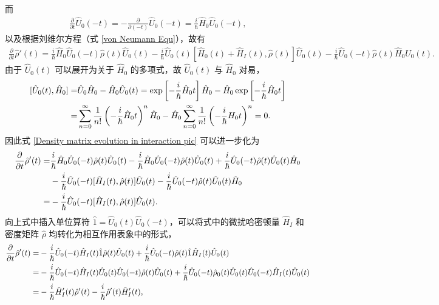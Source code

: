 \documentclass{thesis}
\begin{document}
而
\begin{align}
    \frac{\partial}{\partial t}\hat{U}_0(-t)=-\frac{\partial}{\partial(-t)}\hat{U}_0(-t)=\frac{i}{\hbar}\hat{H}_0\hat{U}_0(-t),
\end{align}
以及根据刘维尔方程（式 \eqref{von Neumann Equ}），故有
\begin{align}
    \label{Density matrix evolution in interaction pic}
    \frac{\partial}{\partial t}\hat{\rho}'(t)=\frac{i}{\hbar}\hat{H}_0\hat{U}_0(-t)\hat{\rho}(t)\hat{U}_0(t)-\frac{i}{\hbar}\hat{U}_0(t)[\hat{H}_0(t)+\hat{H}_I(t),\hat{\rho}(t)]\hat{U}_0(t)-\frac{i}{\hbar}\hat{U}_0(-t)\hat{\rho}(t)\hat{H}_0\hat{U}_0(t).
\end{align}
由于 $\hat{U}_0(t)$ 可以展开为关于 $\hat{H}_0$ 的多项式，故 $\hat{U}_0(t)$ 与 $\hat{H}_0$ 对易，
\begin{align}
    \notag[\hat{U}_0(t),\hat{H}_0]=&\hat{U}_0\hat{H}_0-\hat{H}_0\hat{U}_0(t)=\exp\left[-\frac{i}{\hbar}\hat{H}_0t\right]\hat{H}_0-\hat{H}_0\exp\left[-\frac{i}{\hbar}\hat{H}_0t\right]\\
    =&\sum_{n=0}^{\infty}\frac{1}{n!}\left(-\frac{i}{\hbar}\hat{H}_0t\right)^n\hat{H}_0-\hat{H}_0\sum_{n=0}^{\infty}\frac{1}{n!}\left(-\frac{i}{\hbar}H_0t\right)^n=0.
\end{align}
因此式 \eqref{Density matrix evolution in interaction pic} 可以进一步化为
\begin{align}
    \notag\frac{\partial}{\partial t}\hat{\rho}'(t)=&\frac{i}{\hbar}\hat{H}_0\hat{U}_0(-t)\hat{\rho}(t)\hat{U}_0(t)-\frac{i}{\hbar}\hat{H}_0\hat{U}_0(-t)\hat{\rho}(t)\hat{U}_0(t)+\frac{i}{\hbar}\hat{U}_0(-t)\hat{\rho}(t)\hat{U}_0(t)\hat{H}_0\\
    \notag&-\frac{i}{\hbar}\hat{U}_0(-t)[\hat{H}_I(t),\hat{\rho}(t)]\hat{U}_0(t)-\frac{i}{\hbar}\hat{U}_0(-t)\hat{\rho}(t)\hat{U}_0(t)\hat{H}_0\\
    =&-\frac{i}{\hbar}\hat{U}_0(-t)[\hat{H}_I(t),\hat{\rho}(t)]\hat{U}_0(t).
\end{align}
向上式中插入单位算符 $\hat{1}=\hat{U}_0(t)\hat{U}_0(-t)$，可以将式中的微扰哈密顿量 $\hat{H}_I$ 和密度矩阵 $\hat{\rho}$ 均转化为相互作用表象中的形式，
\begin{align}
    \notag\frac{\partial}{\partial t}\hat{\rho}'(t)=&-\frac{i}{\hbar}\hat{U}_0(-t)\hat{H}_I(t)\hat{1}\hat{\rho}(t)\hat{U}_0(t)+\frac{i}{\hbar}\hat{U}_0(-t)\hat{\rho}(t)\hat{1}\hat{H}_I(t)\hat{U}_0(t)\\
    \notag=&-\frac{i}{\hbar}\hat{U}_0(-t)\hat{H}_I(t)\hat{U}_0(t)\hat{U}_0(-t)\hat{\rho}(t)\hat{U}_0(t)+\frac{i}{\hbar}\hat{U}_0(-t)\hat{\rho}_0(t)\hat{U}_0(t)\hat{U}_0(-t)\hat{H}_I(t)\hat{U}_0(t)\\
    =&-\frac{i}{\hbar}\hat{H}_I'(t)\hat{\rho}'(t)-\frac{i}{\hbar}\hat{\rho}'(t)\hat{H}_I'(t),
\end{align}
\end{document}
